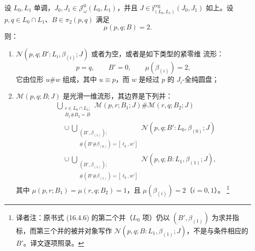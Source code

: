 \begin{theorem}
\label{thm:boundary-of-index-two-floer-moduli}
设 $L_0,L_1$ 单调，$J_0,J_1\in\mathcal J_\omega^0(L_0,L_1)$，并且
$J\in\mathfrak j^{\mathrm{reg}}_{(L_0,L_1)}(J_0,J_1)$ 如上。设
$p,q\in L_0\cap L_1$、$B\in\pi_2(p,q)$ 满足
\begin{equation}
 \mu(p,q;B)=2.
\label{eq:index-two-class}
\end{equation}
则：
\begin{enumerate}[label=(\arabic*)]
\item $\mathcal N(p,q;B':L_i,\beta_{(i)};J)$ 或者为空，或者是如下类型的紧零维
流形：
\[
 p=q,\qquad B'=0,\qquad\mu(\beta_{(i)})=2,
\]
它由位形 $u\#w$ 组成，其中 $u\equiv p$，而 $w$ 是经过 $p$ 的
$J_i$-全纯圆盘；
\item $\mathcal M(p,q;B;J)$ 是光滑一维流形，其边界是下列并：
\begin{equation}
\begin{aligned}
&\bigcup_{\substack{r\in L_0\cap L_1;\\B_1\#B_2=B}}
 \mathcal M(p,r;B_1;J)\#\mathcal M(r,q;B_2;J)\\
&\quad\cup
 \bigcup_{\substack{(B',\beta_{(1)});\\
 [\ell_p,w]\#(B'\#\beta_{(0)})=[\ell_q,w']}}
 \mathcal N(p,q;B':L_0,\beta_{(0)};J)\\
&\quad\cup
 \bigcup_{\substack{(B',\beta_{(1)});\\
 [\ell_p,w]\#(B'\#\beta_{(1)})=[\ell_q,w']}}
 \mathcal N(p,q;B:L_1,\beta_{(1)};J),
\end{aligned}
\label{eq:index-two-moduli-boundary}
\end{equation}
其中 $\mu(p,r;B_1)=\mu(r,q;B_2)=1$，且
$\mu(\beta_{(i)})=2$（$i=0,1$）。
\footnote{译者注：原书式 (16.4.6) 的第二个并（$L_0$ 项）仍以
$(B',\beta_{(1)})$ 为求并指标，而第三个并的被并对象写作
$\mathcal N(p,q;B:L_1,\beta_{(1)};J)$，不是与条件相应的 $B'$。译文逐项照录。}
\end{enumerate}
\end{theorem}

